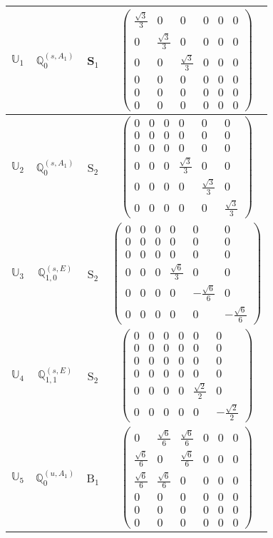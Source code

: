 \documentclass[fleqn,10pt,landscape]{article}
\begin{document}
\begin{itemize}
\begin{center}
\begin{longtable}{c|c|c|c}
$ \mathbb{U}_{1} $ & $\mathbb{Q}_{0}^{(s,A_{1})}$ & S$_{1}$ & $\begin{pmatrix} \frac{\sqrt{3}}{3} & 0 & 0 & 0 & 0 & 0 \\ 0 & \frac{\sqrt{3}}{3} & 0 & 0 & 0 & 0 \\ 0 & 0 & \frac{\sqrt{3}}{3} & 0 & 0 & 0 \\ 0 & 0 & 0 & 0 & 0 & 0 \\ 0 & 0 & 0 & 0 & 0 & 0 \\ 0 & 0 & 0 & 0 & 0 & 0 \end{pmatrix}$ \\ \hline
$ \mathbb{U}_{2} $ & $\mathbb{Q}_{0}^{(s,A_{1})}$ & S$_{2}$ & $\begin{pmatrix} 0 & 0 & 0 & 0 & 0 & 0 \\ 0 & 0 & 0 & 0 & 0 & 0 \\ 0 & 0 & 0 & 0 & 0 & 0 \\ 0 & 0 & 0 & \frac{\sqrt{3}}{3} & 0 & 0 \\ 0 & 0 & 0 & 0 & \frac{\sqrt{3}}{3} & 0 \\ 0 & 0 & 0 & 0 & 0 & \frac{\sqrt{3}}{3} \end{pmatrix}$ \\
$ \mathbb{U}_{3} $ & $\mathbb{Q}_{1,0}^{(s,E)}$ & S$_{2}$ & $\begin{pmatrix} 0 & 0 & 0 & 0 & 0 & 0 \\ 0 & 0 & 0 & 0 & 0 & 0 \\ 0 & 0 & 0 & 0 & 0 & 0 \\ 0 & 0 & 0 & \frac{\sqrt{6}}{3} & 0 & 0 \\ 0 & 0 & 0 & 0 & - \frac{\sqrt{6}}{6} & 0 \\ 0 & 0 & 0 & 0 & 0 & - \frac{\sqrt{6}}{6} \end{pmatrix}$ \\
$ \mathbb{U}_{4} $ & $\mathbb{Q}_{1,1}^{(s,E)}$ & S$_{2}$ & $\begin{pmatrix} 0 & 0 & 0 & 0 & 0 & 0 \\ 0 & 0 & 0 & 0 & 0 & 0 \\ 0 & 0 & 0 & 0 & 0 & 0 \\ 0 & 0 & 0 & 0 & 0 & 0 \\ 0 & 0 & 0 & 0 & \frac{\sqrt{2}}{2} & 0 \\ 0 & 0 & 0 & 0 & 0 & - \frac{\sqrt{2}}{2} \end{pmatrix}$ \\ \hline
$ \mathbb{U}_{5} $ & $\mathbb{Q}_{0}^{(u,A_{1})}$ & B$_{1}$ & $\begin{pmatrix} 0 & \frac{\sqrt{6}}{6} & \frac{\sqrt{6}}{6} & 0 & 0 & 0 \\ \frac{\sqrt{6}}{6} & 0 & \frac{\sqrt{6}}{6} & 0 & 0 & 0 \\ \frac{\sqrt{6}}{6} & \frac{\sqrt{6}}{6} & 0 & 0 & 0 & 0 \\ 0 & 0 & 0 & 0 & 0 & 0 \\ 0 & 0 & 0 & 0 & 0 & 0 \\ 0 & 0 & 0 & 0 & 0 & 0 \end{pmatrix}$ \\ \hline

\end{longtable}
\end{center}
\end{itemize}
\end{document}
